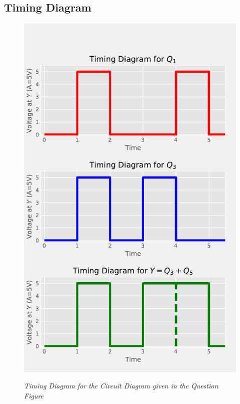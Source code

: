 \documentclass[table,xcdraw]{article}
\begin{document}
\subsection{Timing Diagram}
\begin{figure}[H]
    \centering
    \scalebox{0.68} {
    \includegraphics{figs/graph.pdf} }
    \caption{\textit{Timing Diagram for the Circuit Diagram given in the Question Figure}}
    \label{fig:graph}
\end{figure}
\end{document}
